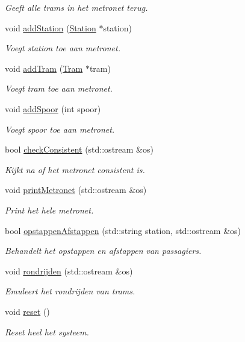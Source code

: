 \begin{DoxyCompactItemize}
\begin{DoxyCompactList}\small\item\em Geeft alle trams in het metronet terug. \end{DoxyCompactList}\item 
void \hyperlink{class_metronet_ac7f4069e577cd4dddb1e166923df3ecb}{add\+Station} (\hyperlink{class_station}{Station} $\ast$station)
\begin{DoxyCompactList}\small\item\em Voegt station toe aan metronet. \end{DoxyCompactList}\item 
void \hyperlink{class_metronet_a3a01132772f4a367d83af40a3c02e224}{add\+Tram} (\hyperlink{class_tram}{Tram} $\ast$tram)
\begin{DoxyCompactList}\small\item\em Voegt tram toe aan metronet. \end{DoxyCompactList}\item 
void \hyperlink{class_metronet_a0422381a8d7f32a915e0ad966af43627}{add\+Spoor} (int spoor)
\begin{DoxyCompactList}\small\item\em Voegt spoor toe aan metronet. \end{DoxyCompactList}\item 
bool \hyperlink{class_metronet_a3125e980b208f1cdd04a9c26ec92a7bf}{check\+Consistent} (std\+::ostream \&os)
\begin{DoxyCompactList}\small\item\em Kijkt na of het metronet consistent is. \end{DoxyCompactList}\item 
void \hyperlink{class_metronet_a3d8b85c241fff3a9353c06320226e84e}{print\+Metronet} (std\+::ostream \&os)
\begin{DoxyCompactList}\small\item\em Print het hele metronet. \end{DoxyCompactList}\item 
bool \hyperlink{class_metronet_a78c0cd9912306a5f7438ea43f5088e0a}{opstappen\+Afstappen} (std\+::string station, std\+::ostream \&os)
\begin{DoxyCompactList}\small\item\em Behandelt het opstappen en afstappen van passagiers. \end{DoxyCompactList}\item 
void \hyperlink{class_metronet_a180b666c7d4cc52f873579ab7f95ea35}{rondrijden} (std\+::ostream \&os)
\begin{DoxyCompactList}\small\item\em Emuleert het rondrijden van trams. \end{DoxyCompactList}\item 
void \hyperlink{class_metronet_aae72fb7ad05324adb1ccc6a1519c5c0b}{reset} ()
\begin{DoxyCompactList}\small\item\em Reset heel het systeem. \end{DoxyCompactList}\end{DoxyCompactItemize}


